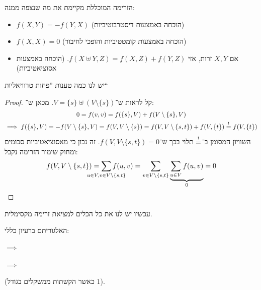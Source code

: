 \documentclass[]{../../../../tex/classes/styledArticle}
\begin{document}
	
	הזרימה המוכללת מקיימת את מה שנצפה ממנה: 
	\begin{itemize}
		\item $f(X, Y) = -f(Y, X)$ (הוכחה באמצעות דיסטרבוטיביות)
		\item $f(X, X) = 0$ (הוכחה באמצעות קומטטיביות והופכי לחיבור)
		\item אם $X, Y$ זרות, אזי $f(X \uplus Y, Z) = f(X, Z) + f(Y, Z)$. (הוכחה באמצעות אסוציאטיביות)
	\end{itemize}
	יש לנו כמה טענות ''פחות טרוויאליות``
	\lem{
	\[ \sof f = \sum_{v \in V} f(s, v) = f(\{s\}, V) = f(V, \{s\}) = \sum_{v \in V}f(t, v) \]}
	\begin{proof}
		קל לראות ש־$V = \{s\} \uplus (V \setminus \{s\})$. מכאן ש־: 
		\begin{multline*}
			0 = f(v, v) = f(\{s\}, V) + f(V \setminus \{s\}, V) 
			\\ \implies f(\{s\}, V) = -f(V \setminus \{s\}, V) = f(V, V \setminus \{s\}) = f(V, V \setminus\{s, t\}) + f(V, \{t\}) \overset{!}{=} f(V, \{t\})
		\end{multline*}
		השוויון המסומן ב־$\overset{!}{=}$ תלוי בכך ש־$f(V, V \setminus \{s, t\}) = 0$. זה נכון כי מאסוציאטיביות סכומים ומחוק שימור הזרימה נקבל: 
		\[ f(V, V \setminus \{s, t\}) = \sum_{\mathclap{u \in V, v \in V \setminus \{s, t\}}} f(u, v) = \sum_{v \in V \setminus \{s, t\}} \underbrace{\sum_{u \in V} f(u, v)}_{0} = 0 \]\envendproof
	\end{proof}
	
	
	עכשיו יש לנו את כל הכלים למציאת זרימה מקסימלית. 
	
	האלגוריתם ברעיון כללי: 
	\begin{center}
		\sen
		$\implies$
		$\implies$
		\she
	\end{center}
	
			(כאשר הקשתות ממשקלים בגודל $1$). 
	
\end{document}
